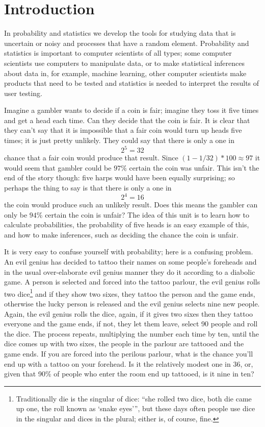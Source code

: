 \documentclass[11pt,a4paper]{scrartcl}
\begin{document}
\section*{Introduction}

In probability and statistics we develop the tools for studying data
that is uncertain or noisy and processes that have a random
element. Probability and statistics is important to computer
scientists of all types; some computer scientists use computers to
manipulate data, or to make statistical inferences about data in, for
example, machine learning, other computer scientists make products
that need to be tested and statistics is needed to interpret the
results of user testing.

Imagine a gambler wants to decide if a coin is fair; imagine they toss
it five times and get a head each time. Can they decide that the coin is
fair. It is clear that they can't say that it is
impossible that a fair coin would turn up heads five times; it is just
pretty unlikely. They could say that there is only a one in
\begin{equation}
2^{5}=32
\end{equation}
chance that a fair coin would produce that result. Since
$(1-1/32)*100\approx 97$ it would seem that gambler could be $97\%$
certain the coin was unfair. This isn't the end of the story though:
five harps would have been equally surprising; so perhaps the thing to
say is that there is only a one in
\begin{equation}
2^{4}=16
\end{equation}
the coin would produce such an unlikely result. Does this means the
gambler can only be $94\%$ certain the coin is unfair? The idea of
this unit is to learn how to calculate probabilities, the probability
of five heads is an easy example of this, and how to make inferences,
such as deciding the chance the coin is unfair.

It is very easy to confuse yourself with probability; here is a
confusing problem. An evil genius has decided to tattoo their names on
some people's foreheads and in the usual over-elaborate evil genius
manner they do it according to a diabolic game. A person is selected
and forced into the tattoo parlour, the evil genius rolls two
dice\footnote{Traditionally die is the singular of
  dice: ``she rolled two dice, both die came up one, the roll known as
  `snake eyes''', but these days often people use dice in the singular
  and dices in the plural; either is, of course, fine.} and
if they show two sixes, they tattoo the person and the game ends,
otherwise the lucky person is released and the evil genius selects
nine new people. Again, the evil genius rolls the dice, again, if it
gives two sixes then they tattoo everyone and the game ends, if not,
they let them leave, select 90 people and roll the dice. The process
repeats, multiplying the number each time by ten, until the dice comes
up with two sixes, the people in the parlour are tattooed and the game
ends. If you are forced into the perilous parlour, what is the chance you'll
end up with a tattoo on your forehead. Is it the relatively modest one
in 36, or, given that 90\% of people who enter the room end up
tattooed, is it nine in ten?
\end{document}
